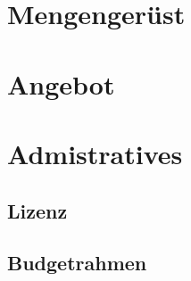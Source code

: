 \documentclass[12pt]{article}
\theoremstyle{definition}
\begin{document}
\section{Mengengerüst}



\pagebreak

\section{Angebot}




\pagebreak

\section{Admistratives}

\subsection{Lizenz}

\subsection{Budgetrahmen}
\end{document}
